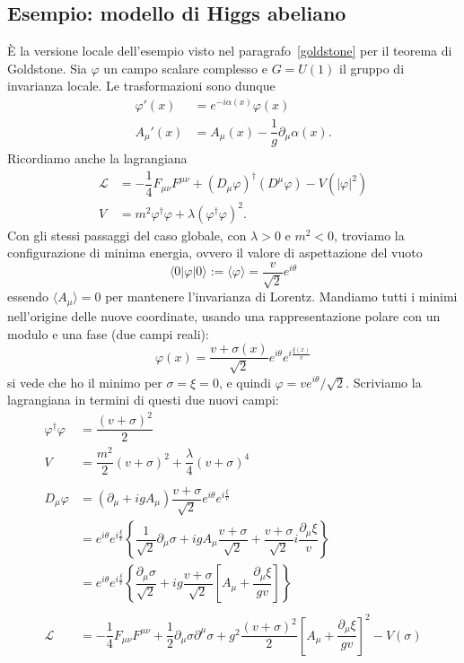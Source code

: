 \documentclass[italian,a4paper]{article}
\theoremstyle{definition}
\newcommand{\lagr}{\ensuremath{\mathscr{L}}}
\newcommand{\dimu}{\ensuremath{\partial_{\mu}}}
\newcommand{\Dimu}{\ensuremath{D_{\mu}}}
\begin{document}
\subsection*{Esempio: modello di Higgs abeliano}
\`E la versione locale dell'esempio visto nel
paragrafo~\ref{goldstone} per il teorema di Goldstone. Sia $\varphi$ un
campo scalare complesso e $G = U(1)$ il gruppo di invarianza locale. Le
trasformazioni sono dunque
\begin{align*}
    \varphi'(x) &= e^{-i \alpha(x)}\varphi(x)\\
    A_\mu'(x) &= A_\mu(x) - \dfrac{1}{g}\partial_\mu \alpha(x).
\end{align*}
Ricordiamo anche la lagrangiana
\begin{align*}
    \lagr &= -\dfrac{1}{4}F_{\mu\nu}F^{\mu\nu} + (D_\mu\varphi)^\dagger(D^\mu
    \varphi) - V(|\varphi|^2)\\
    V &= m^2 \varphi^\dagger \varphi + \lambda (\varphi^\dagger \varphi)^2.
\end{align*}
Con gli stessi passaggi del caso globale, con $\lambda > 0$ e $m^2 <0$,
troviamo la configurazione di minima energia, ovvero il valore di
aspettazione del vuoto
\begin{equation*}
    \langle 0 \vert \varphi \vert 0 \rangle \mathop:= \langle \varphi
    \rangle = \dfrac{v}{\sqrt{2}}e^{i\theta}
\end{equation*}
essendo $\langle A_\mu \rangle = 0$ per mantenere l'invarianza di Lorentz.
Mandiamo tutti i minimi nell'origine delle nuove coordinate, usando una
rappresentazione polare con un modulo e una fase (due campi reali):
\begin{equation*}
    \varphi(x) = \dfrac{v +
    \sigma(x)}{\sqrt{2}}e^{i\theta}e^{i\frac{\xi(x)}{v}}
\end{equation*}
si vede che ho il minimo per $\sigma = \xi = 0$, e quindi $\varphi =
ve^{i\theta}/\sqrt{2}$. Scriviamo la lagrangiana in termini di questi due
nuovi campi:
\begin{align*}
    \varphi^\dagger \varphi &= \dfrac{(v + \sigma)^2}{2}\\
    V &= \dfrac{m^2}{2}(v + \sigma)^2 + \dfrac{\lambda}{4}(v + \sigma)^4\\
    \\
    \Dimu \varphi &= (\dimu + i g A_{\mu}) \dfrac{v +
    \sigma}{\sqrt{2}}e^{i\theta}e^{i\frac{\xi}{v}}\\
    &= e^{i\theta}e^{i\frac{\xi}{v}}
    \left\{
    \dfrac{1}{\sqrt{2}}\dimu \sigma 
    + i g A_\mu \dfrac{v + \sigma}{\sqrt{2}}
    + \dfrac{v + \sigma}{\sqrt{2}} i\dfrac{\dimu \xi}{v}\right\}\\
    &= e^{i\theta}e^{i\frac{\xi}{v}}
    \left\{
    \dfrac{\dimu \sigma}{\sqrt{2}}
    + i g \dfrac{v + \sigma}{\sqrt{2}} \left[ A_\mu + \dfrac{\dimu \xi}{gv}\right]
    \right\}\\
    \\
    \lagr &= -\dfrac{1}{4}F_{\mu\nu}F^{\mu\nu}
    + \dfrac{1}{2}\partial_\mu \sigma \partial^\mu \sigma
    + g^2 \dfrac{(v + \sigma)^2}{2}\left[ A_{\mu} + \dfrac{\dimu
    \xi}{gv}\right]^2 - V(\sigma)
\end{align*}
\end{document}

